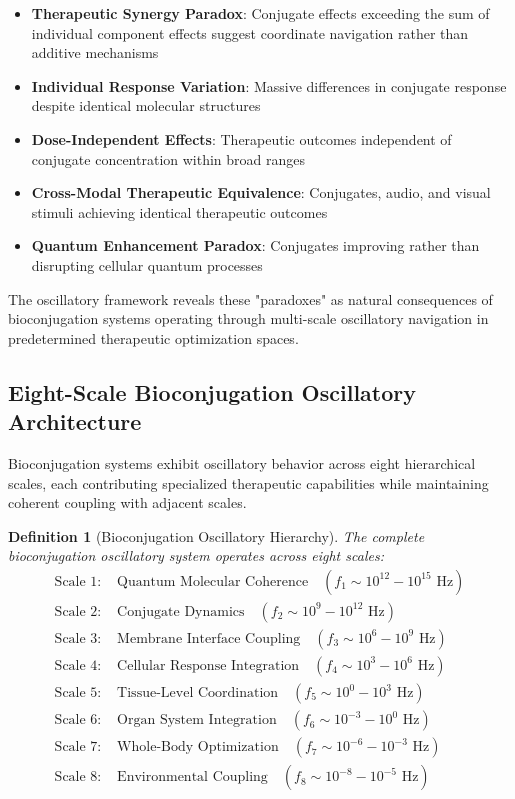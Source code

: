 \documentclass[12pt,a4paper]{article}
\newtheorem{definition}{Definition}
\begin{document}
\begin{itemize}
\item \textbf{Therapeutic Synergy Paradox}: Conjugate effects exceeding the sum of individual component effects suggest coordinate navigation rather than additive mechanisms
\item \textbf{Individual Response Variation}: Massive differences in conjugate response despite identical molecular structures
\item \textbf{Dose-Independent Effects}: Therapeutic outcomes independent of conjugate concentration within broad ranges
\item \textbf{Cross-Modal Therapeutic Equivalence}: Conjugates, audio, and visual stimuli achieving identical therapeutic outcomes
\item \textbf{Quantum Enhancement Paradox}: Conjugates improving rather than disrupting cellular quantum processes
\end{itemize}

The oscillatory framework reveals these "paradoxes" as natural consequences of bioconjugation systems operating through multi-scale oscillatory navigation in predetermined therapeutic optimization spaces.

\subsection{Eight-Scale Bioconjugation Oscillatory Architecture}

Bioconjugation systems exhibit oscillatory behavior across eight hierarchical scales, each contributing specialized therapeutic capabilities while maintaining coherent coupling with adjacent scales.

\begin{definition}[Bioconjugation Oscillatory Hierarchy]
The complete bioconjugation oscillatory system operates across eight scales:
\begin{align}
\text{Scale 1: } &\text{Quantum Molecular Coherence} \quad (f_1 \sim 10^{12}-10^{15} \text{ Hz}) \\
\text{Scale 2: } &\text{Conjugate Dynamics} \quad (f_2 \sim 10^9-10^{12} \text{ Hz}) \\
\text{Scale 3: } &\text{Membrane Interface Coupling} \quad (f_3 \sim 10^6-10^9 \text{ Hz}) \\
\text{Scale 4: } &\text{Cellular Response Integration} \quad (f_4 \sim 10^3-10^6 \text{ Hz}) \\
\text{Scale 5: } &\text{Tissue-Level Coordination} \quad (f_5 \sim 10^0-10^3 \text{ Hz}) \\
\text{Scale 6: } &\text{Organ System Integration} \quad (f_6 \sim 10^{-3}-10^0 \text{ Hz}) \\
\text{Scale 7: } &\text{Whole-Body Optimization} \quad (f_7 \sim 10^{-6}-10^{-3} \text{ Hz}) \\
\text{Scale 8: } &\text{Environmental Coupling} \quad (f_8 \sim 10^{-8}-10^{-5} \text{ Hz})
\end{align}
\end{definition}
\end{document}

